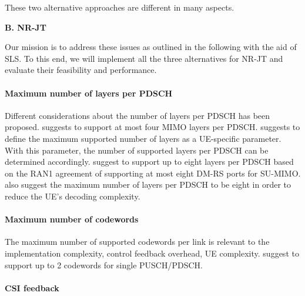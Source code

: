 \documentclass[a4paper,12pt]{article}%
\begin{document}
















These two alternative approaches are different in many aspects.



\noindent \textbf{B. NR-JT}

Our mission is to address these issues as outlined in the following with the aid of SLS. To this end, we will implement all the three alternatives for NR-JT and evaluate their feasibility and performance.


\paragraph{Maximum number of layers per PDSCH}

Different considerations about the number of layers per PDSCH has been proposed. \cite{R1-1710523} suggests to support at most four MIMO layers per PDSCH. \cite{R1-1710180} suggests to define the maximum supported number of layers as a UE-specific parameter. With this parameter, the number of supported layers per PDSCH can be determined accordingly. \cite{R1-1710141} suggest to support up to eight layers per PDSCH based on the RAN1 agreement of supporting at most eight DM-RS ports for SU-MIMO. \cite{R1-1710451} also suggest the maximum number of layers per PDSCH to be eight in order to reduce the UE's decoding complexity.


\paragraph{Maximum number of codewords}

The maximum number of supported codewords per link is relevant to the implementation complexity, control feedback overhead, UE complexity. \cite{R1-1710055} suggest to support up to 2 codewords for single PUSCH/PDSCH.

\paragraph{CSI feedback}
\end{document}
